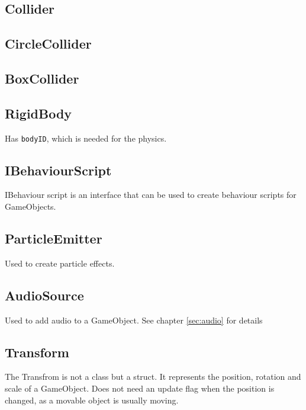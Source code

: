 \subsection{Collider}

\subsection{CircleCollider}

\subsection{BoxCollider}

\subsection{RigidBody}
Has \texttt{bodyID}, which is needed for the physics.

\subsection{IBehaviourScript}
IBehaviour script is an interface that can be used to create behaviour scripts for GameObjects.

\subsection{ParticleEmitter}
Used to create particle effects.

\subsection{AudioSource}
Used to add audio to a GameObject. See chapter \autoref{sec:audio} for details

\subsection{Transform}
The Transfrom is not a class but a struct. It represents the position, rotation and scale of a GameObject.
Does not need an update flag when the position is changed, as a movable object is usually moving.


